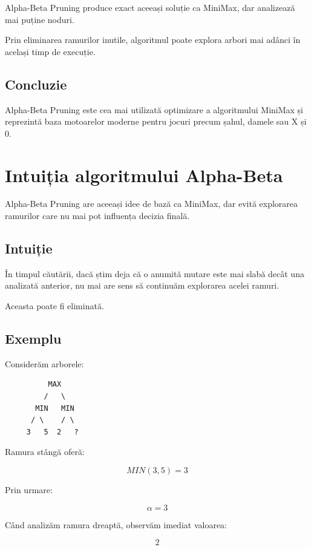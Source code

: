 \documentclass[12pt,a4paper]{article}
\begin{document}
Alpha-Beta Pruning produce exact aceeași soluție ca MiniMax, dar analizează mai puține noduri.

Prin eliminarea ramurilor inutile, algoritmul poate explora arbori mai adânci în același timp de execuție.

\subsection{Concluzie}

Alpha-Beta Pruning este cea mai utilizată optimizare a algoritmului MiniMax și reprezintă baza motoarelor moderne pentru jocuri precum șahul, damele sau X și 0.








\section{Intuiția algoritmului Alpha-Beta}

Alpha-Beta Pruning are aceeași idee de bază ca MiniMax, dar evită explorarea ramurilor care nu mai pot influența decizia finală.

\subsection{Intuiție}

În timpul căutării, dacă știm deja că o anumită mutare este mai slabă decât una analizată anterior, nu mai are sens să continuăm explorarea acelei ramuri.

Aceasta poate fi eliminată.

\subsection{Exemplu}

Considerăm arborele:

\begin{verbatim}
          MAX
         /   \
       MIN   MIN
      / \    / \
     3   5  2   ?
\end{verbatim}

Ramura stângă oferă:

\[
MIN(3,5)=3
\]

Prin urmare:

\[
\alpha = 3
\]

Când analizăm ramura dreaptă, observăm imediat valoarea:

\[
2
\]
\end{document}
